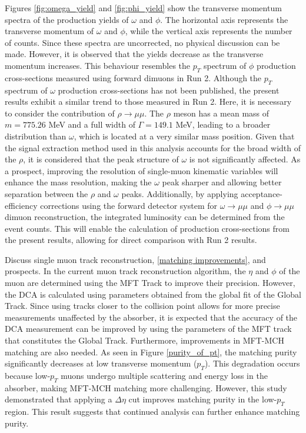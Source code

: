     Figures \ref{fig:omega_yield} and \ref{fig:phi_yield} show the transverse momentum spectra of the production yields of $\omega$ and $\phi$. The horizontal axis represents the transverse momentum of $\omega$ and $\phi$, while the vertical axis represents the number of counts.
    Since these spectra are uncorrected, no physical discussion can be made. However, it is observed that the yields decrease as the transverse momentum increases. This behaviour resembles the $p_T$ spectrum of $\phi$ production cross-sections measured using forward dimuons in Run 2. Although the $p_T$ spectrum of $\omega$ production cross-sections has not been published, the present results exhibit a similar trend to those measured in Run 2.  
    Here, it is necessary to consider the contribution of $\rho \rightarrow \mu\mu$. The $\rho$ meson has a mean mass of $m = 775.26$ MeV and a full width of $\Gamma = 149.1$ MeV, leading to a broader distribution than $\omega$, which is located at a very similar mass position. Given that the signal extraction method used in this analysis accounts for the broad width of the $\rho$, it is considered that the peak structure of $\omega$ is not significantly affected.  
    As a prospect, improving the resolution of single-muon kinematic variables will enhance the mass resolution, making the $\omega$ peak sharper and allowing better separation between the $\rho$ and $\omega$ peaks. Additionally, by applying acceptance-efficiency corrections using the forward detector system for $\omega \rightarrow \mu\mu$ and $\phi \rightarrow \mu\mu$ dimuon reconstruction, the integrated luminosity can be determined from the event counts. This will enable the calculation of production cross-sections from the present results, allowing for direct comparison with Run 2 results.
   
   
    Discuss single muon track reconstruction, \ref{matching improvements}, and prospects. In the current muon track reconstruction algorithm, the \(\eta\) and \(\phi\) of the muon are determined using the MFT Track to improve their precision. However, the DCA is calculated using parameters obtained from the global fit of the Global Track. Since using tracks closer to the collision point allows for more precise measurements unaffected by the absorber, it is expected that the accuracy of the DCA measurement can be improved by using the parameters of the MFT track that constitutes the Global Track. Furthermore, improvements in MFT-MCH matching are also needed. As seen in Figure \ref{purity_of_pt}, the matching purity significantly decreases at low transverse momentum (\( p_T \)). This degradation occurs because low-\( p_T \) muons undergo multiple scattering and energy loss in the absorber, making MFT-MCH matching more challenging. However, this study demonstrated that applying a \( \Delta \eta \) cut improves matching purity in the low-\( p_T \) region. This result suggests that continued analysis can further enhance matching purity.
   
